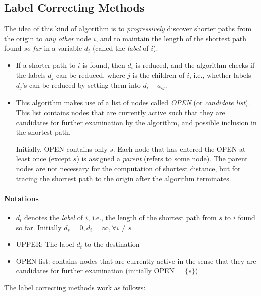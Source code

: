\subsection{Label Correcting Methods}
The idea of this kind of algorithm is to \emph{progressively} discover shorter paths from the origin to \emph{any other} node $i$, and to maintain the length of the shortest path found \emph{so far} in a variable $d_i$ (called the \emph{label} of $i$). 
\begin{itemize}
\item
If a shorter path to $i$ is found, then $d_i$ is reduced, and the algorithm checks if the labels $d_j$ can be reduced, where $j$ is the children of $i$, i.e., whether labels $d_j$'s can be reduced by setting them into $d_{i} + a_{ij}$.
\item
This algorithm makes use of a list of nodes called \emph{OPEN} (or \emph{candidate list}). This list contains nodes that are currently active such that they are candidates for further examination by the algorithm, and possible inclusion in the shortest path.

Initially, OPEN contains only $s$. Each node that has entered the OPEN at least once (except $s$) is assigned a \emph{parent} (refers to some node). The parent nodes are not necessary for the computation of shortest distance, but for tracing the shortest path to the origin after the algorithm terminates.
\end{itemize}
\paragraph{Notations}
\begin{itemize}
\item
$d_i$ denotes the \emph{label} of $i$, i.e., the length of the shortest path from $s$ to $i$ found so far. Initially $d_s=0,d_i=\infty,\forall i\ne s$
\item
UPPER: The label $d_t$ to the destination
\item
OPEN list: contains nodes that are currently active in the sense that they are candidates for further examination (initially OPEN = $\{s\}$)
\end{itemize}
The label correcting methods work as follows:

